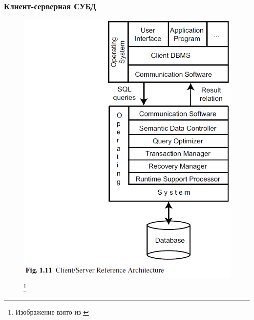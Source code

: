 \documentclass{beamer}
\begin{document}
\begin{frame}
\frametitle{Клиент-серверная СУБД}

\begin{figure}[htb]
	\includegraphics[width=\textwidth,height=0.80\textheight,keepaspectratio]{ozsu-7.png} 
	\footnote{\tiny{Изображение взято из \cite{Ozsu2011}}}
\end{figure}

\end{frame}
\end{document}
